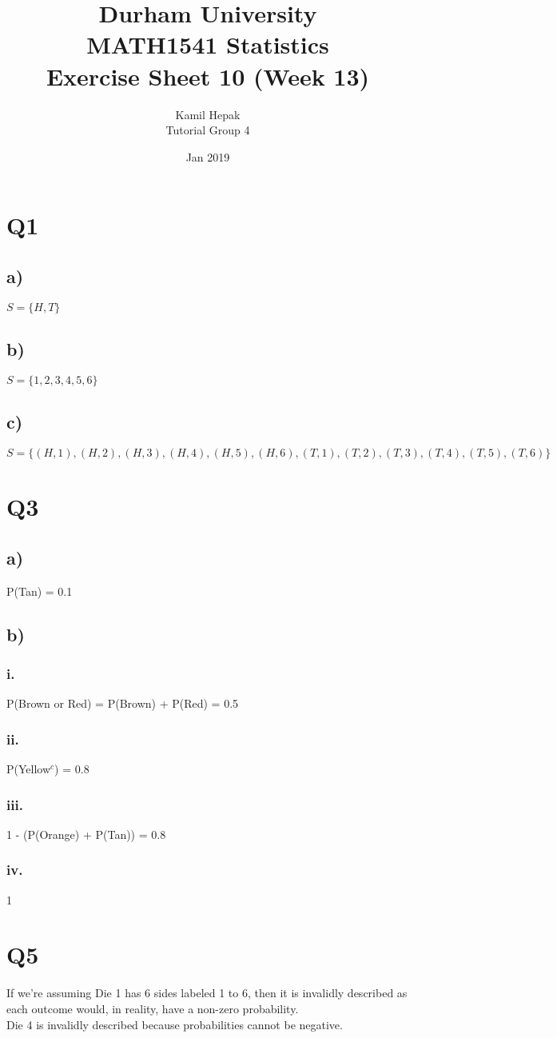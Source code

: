 \documentclass[]{article}
\title{\vspace{-3.0cm}Durham University\\
    MATH1541 Statistics \\
	Exercise Sheet 10 (Week 13)}
\author{Kamil Hepak\\
        Tutorial Group 4}
\date{Jan 2019}
\begin{document}
\maketitle

\section{Q1}
\subsection{a)}
$S = \{H,T\}$
\subsection{b)}
$S = \{1,2,3,4,5,6\}$
\subsection{c)}
$S = \{(H,1),(H,2),(H,3),(H,4),(H,5),(H,6),(T,1),(T,2),(T,3),(T,4),(T,5),(T,6)\}$


\section{Q3}
\subsection{a)}
P(Tan) = 0.1
\subsection{b)}
\subsubsection{i.}
P(Brown or Red) = P(Brown) + P(Red) = 0.5
\subsubsection{ii.}
P(Yellow$^c$) = 0.8
\subsubsection{iii.}
1 - (P(Orange) + P(Tan)) = 0.8
\subsubsection{iv.}
1

\section{Q5}
If we're assuming Die 1 has 6 sides labeled 1 to 6, then it is invalidly described as each outcome would, in reality, have a non-zero probability.
\\
Die 4 is invalidly described because probabilities cannot be negative.
\end{document}
